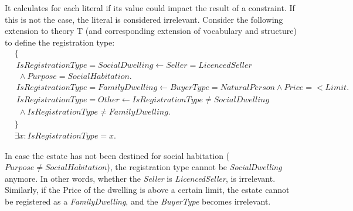 It calculates for each literal if its value could impact the result of a constraint.
If this is not the case, the literal is considered irrelevant.
Consider the following extension to theory T (and corresponding extension of vocabulary and structure) to define the registration type:
\begin{align*}
& \{ \\
& ~ IsRegistrationType = SocialDwelling \leftarrow Seller = LicencedSeller \\ 
& ~~ \wedge Purpose = SocialHabitation.\\
& ~ IsRegistrationType = FamilyDwelling \leftarrow BuyerType = NaturalPerson \wedge Price =< Limit. \\
& ~ IsRegistrationType = Other \leftarrow IsRegistrationType \neq SocialDwelling \\
& ~~ \wedge IsRegistrationType \neq FamilyDwelling.\\
& \}\\
& \exists x : IsRegistrationType = x.
\end{align*}

In case the estate has not been destined for social habitation ($Purpose \neq SocialHabitation$), the registration type cannot be \textit{SocialDwelling} anymore.
In other words, whether the \textit{Seller} is \textit{LicencedSeller}, is irrelevant.
Similarly, if the Price of the dwelling is above a certain limit, the estate cannot be registered as a \textit{FamilyDwelling}, and the \textit{BuyerType} becomes irrelevant.

